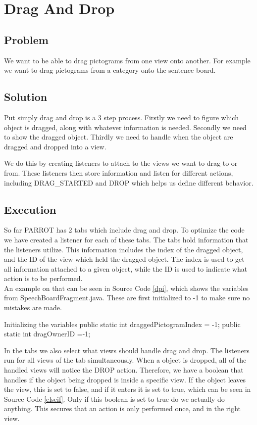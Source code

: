 \section{Drag And Drop} 
\label{dnd}
\subsection*{Problem}
We want to be able to drag pictograms from one view onto another. 
For example we want to drag pictograms from a category onto the sentence board. 

\subsection*{Solution}
Put simply drag and drop is a 3 step process.
Firstly we need to figure which object is dragged, along with whatever information is needed. 
Secondly we need to show the dragged object.
Thirdly we need to handle when the object are dragged and dropped into a view.\newline

We do this by creating listeners to attach to the views we want to drag to or from. 
These listeners then store information and listen for different actions, including DRAG\_STARTED and DROP which helps us define different behavior.

\subsection*{Execution}
So far PARROT has 2 tabs which include drag and drop. To optimize the code we have created a listener for each of these tabs.
The tabs hold information that the listeners utilize. This information includes the index of the dragged object, and the ID of the view which held the dragged object. The index is used to get all information attached to a given object, while the ID is used to indicate what action is to be performed.\\
An example on that can be seen in Source Code \ref{dpi}, which shows the variables from SpeechBoardFragment.java.
These are first initialized to -1 to make sure no mistakes are made.

\begin{source}[{dpi}]{Initializing the variables}
public static int draggedPictogramIndex = -1;
public static int dragOwnerID =-1;
\end{source} 

In the tabs we also select what views should handle drag and drop.
The listeners run for all views of the tab simultaneously. When a object is dropped, all of the handled views will notice the DROP action. Therefore, we have a boolean that handles if the object being dropped is inside a specific view. 
If the object leaves the view, this is set to false, and if it enters it is set to true, which can be seen in Source Code \ref{elseif}. 
Only if this boolean is set to true do we actually do anything. This secures that an action is only performed once, and in the right view. 

